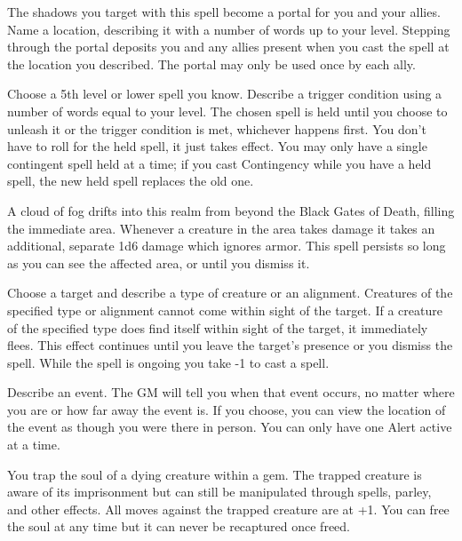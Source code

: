  The shadows you target with this spell become a portal for you and your allies. Name a location, describing it with a number of words up to your level. Stepping through the portal deposits you and any allies present when you cast the spell at the location you described. The portal may only be used once by each ally.





 Choose a 5th level or lower spell you know. Describe a trigger condition using a number of words equal to your level. The chosen spell is held until you choose to unleash it or the trigger condition is met, whichever happens first. You don't have to roll for the held spell, it just takes effect. You may only have a single contingent spell held at a time; if you cast Contingency while you have a held spell, the new held spell replaces the old one.





 A cloud of fog drifts into this realm from beyond the Black Gates of Death, filling the immediate area. Whenever a creature in the area takes damage it takes an additional, separate 1d6 damage which ignores armor. This spell persists so long as you can see the affected area, or until you dismiss it.





 Choose a target and describe a type of creature or an alignment. Creatures of the specified type or alignment cannot come within sight of the target. If a creature of the specified type does find itself within sight of the target, it immediately flees. This effect continues until you leave the target's presence or you dismiss the spell. While the spell is ongoing you take -1 to cast a spell.





 Describe an event. The GM will tell you when that event occurs, no matter where you are or how far away the event is. If you choose, you can view the location of the event as though you were there in person. You can only have one Alert active at a time.

\newpage


 You trap the soul of a dying creature within a gem. The trapped creature is aware of its imprisonment but can still be manipulated through spells, parley, and other effects. All moves against the trapped creature are at +1. You can free the soul at any time but it can never be recaptured once freed.


